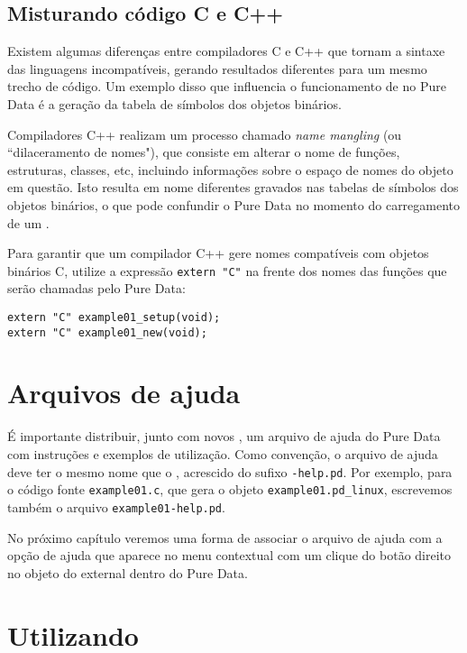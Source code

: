 
\subsection{Misturando código C e C++}

Existem algumas diferenças entre compiladores C e C++ que tornam a sintaxe das
linguagens incompatíveis, gerando resultados diferentes para um mesmo trecho
de código. Um exemplo disso que influencia o funcionamento de \externals no
Pure Data é a geração da tabela de símbolos dos objetos binários.

Compiladores C++ realizam um processo chamado \emph{name mangling} (ou
``dilaceramento de nomes"), que consiste em alterar o nome de funções,
estruturas, classes, etc, incluindo informações sobre o espaço de nomes do
objeto em questão. Isto resulta em nome diferentes gravados nas tabelas de
símbolos dos objetos binários, o que pode confundir o Pure Data no momento do
carregamento de um \external.

Para garantir que um compilador C++ gere nomes compatíveis com objetos
binários C, utilize a expressão \texttt{extern "C"} na frente dos nomes das
funções que serão chamadas pelo Pure Data:

\begin{lstlisting}
extern "C" example01_setup(void);
extern "C" example01_new(void);
\end{lstlisting}


\section{Arquivos de ajuda}

É importante distribuir, junto com novos \externals, um arquivo de ajuda do
Pure Data com instruções e exemplos de utilização. Como convenção, o arquivo
de ajuda deve ter o mesmo nome que o \external, acrescido do sufixo
\texttt{-help.pd}. Por exemplo, para o código fonte \texttt{example01.c}, que
gera o objeto \texttt{example01.pd\_linux}, escrevemos também o arquivo
\texttt{example01-help.pd}.

No próximo capítulo veremos uma forma de associar o arquivo de ajuda com a
opção de ajuda que aparece no menu contextual com um clique do botão direito
no objeto do external dentro do Pure Data.

\section{Utilizando \externals}
\label{sec:using}

